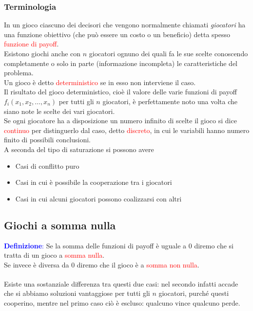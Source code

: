 \documentclass[12pt,a4paper]{article}
\begin{document}
\subsubsection{Terminologia}
In un gioco ciascuno dei decisori che vengono normalmente chiamati \textsl{giocatori} ha una funzione obiettivo (che può essere un costo o un beneficio) detta spesso \textcolor{red}{funzione di payoff}.\\
Esistono giochi anche con $n$ giocatori ognuno dei quali fa le sue scelte conoscendo completamente o solo in parte (informazione incompleta) le caratteristiche del problema.\\
Un gioco è detto \textcolor{red}{deterministico} se in esso non interviene il caso.\\
Il risultato del gioco deterministico, cioè il valore delle varie funzioni di payoff $f_i(x_1,x_2,\dots,x_n)$ per tutti gli $n$ giocatori, è perfettamente noto una volta che siano note le scelte dei vari giocatori.\\
Se ogni giocatore ha a disposizione un numero infinito di scelte il gioco si dice \textcolor{red}{continuo} per distinguerlo dal caso, detto \textcolor{red}{discreto}, in cui le variabili hanno numero finito di possibili conclusioni.\\
A seconda del tipo di saturazione si possono avere \begin{itemize}
\item Casi di conflitto puro
\item Casi in cui è possibile la cooperazione tra i giocatori
\item Casi in cui alcuni giocatori possono coalizzarsi con altri
\end{itemize}

\subsection{Giochi a somma nulla}
\textcolor{blue}{\textbf{Definizione}:} Se la somma delle funzioni di payoff è uguale a 0 diremo che si tratta di un gioco a \textcolor{red}{somma nulla}.\\
Se invece è diversa da 0 diremo che il gioco è a \textcolor{red}{somma non nulla}.\\
\\
Esiste una sostanziale differenza tra questi due casi: nel secondo infatti accade che si abbiamo soluzioni vantaggiose per tutti gli $n$ giocatori, purché questi cooperino, mentre nel primo caso ciò è escluso: qualcuno vince qualcuno perde.
\end{document}
